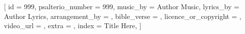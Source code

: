 
















[
    id                     = {999},
    psalterio_number       = {999},
    music_by               = {Author Music},
    lyrics_by              = {Author Lyrics},
    arrangement_by         = {},
    bible_verse            = {},
    licence_or_copyright   = {},
    video_url              = {},
    extra                  = {},
    index                  = {Title Here},
]


\beginverse

